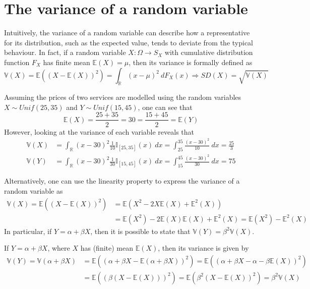 \documentclass{report}
\begin{document}
\section{The variance of a random variable}
Intuitively, the variance of a random variable can describe how a representative for its distribution, such as the expected value, tends to deviate from the typical behaviour. \newline
In fact, if a random variable $\displaystyle X: \Omega \to S_X$ with cumulative distribution function $\displaystyle F_X$ has finite mean $\displaystyle \mathbb{E}(X) = \mu$, then its variance is formally defined as
\[\mathbb{V}(X) = \mathbb{E}((X - \mathbb{E}(X))^2) = \int_{\mathbb{R}} (x - \mu)^2 \ dF_X(x) \Rightarrow SD(X) = \sqrt{\mathbb{V}(X)}\]
\begin{examplebox}
    Assuming the prices of two services are modelled using the random variables $\displaystyle X \sim Unif(25, 35)$ and $\displaystyle Y \sim Unif(15, 45)$, one can see that
    \[\mathbb{E}(X) = \frac{25 + 35}{2} = 30 = \frac{15 + 45}{2} = \mathbb{E}(Y)\]
    However, looking at the variance of each variable reveals that
    \begin{align*}
        \mathbb{V}(X) &= \int_{\mathbb{R}} (x - 30)^2\frac{1}{10}\mathbb{I}_{[25, 35]}(x) \ dx = \int_{25}^{35} \frac{(x - 30)^2}{10} \ dx = \frac{25}{3} \\
        \mathbb{V}(Y) &= \int_{\mathbb{R}} (x - 30)^2\frac{1}{30}\mathbb{I}_{[15, 45]}(x) \ dx = \int_{15}^{45} \frac{(x - 30)^2}{30} \ dx = 75
    \end{align*}
\end{examplebox}
\noindent Alternatively, one can use the linearity property to express the variance of a random variable as
\begin{align*}
    \mathbb{V}(X) = \mathbb{E}((X - \mathbb{E}(X))^2)
        &= \mathbb{E}(X^2 - 2X\mathbb{E}(X) + \mathbb{E}^2(X)) \\
        &= \mathbb{E}(X^2) - 2\mathbb{E}(X)\mathbb{E}(X) + \mathbb{E}^2(X) = \mathbb{E}(X^2) - \mathbb{E}^2(X)
\end{align*}
In particular, if $\displaystyle Y = \alpha + \beta X$, then it is possible to state that $\displaystyle \mathbb{V}(Y) = \beta^2\mathbb{V}(X)$.
\begin{proofbox}
    If $\displaystyle Y = \alpha + \beta X$, where $\displaystyle X$ has (finite) mean $\displaystyle \mathbb{E}(X)$, then its variance is given by
    \begin{align*}
        \mathbb{V}(Y) = \mathbb{V}(\alpha + \beta X)
            &= \mathbb{E}((\alpha + \beta X - \mathbb{E}(\alpha + \beta X))^2) = \mathbb{E}((\alpha + \beta X - \alpha - \beta\mathbb{E}(X))^2) \\
            &= \mathbb{E}((\beta(X - \mathbb{E}(X)))^2) = \mathbb{E}(\beta^2(X - \mathbb{E}(X))^2) = \beta^2\mathbb{V}(X)
    \end{align*}
\end{proofbox}
\end{document}
